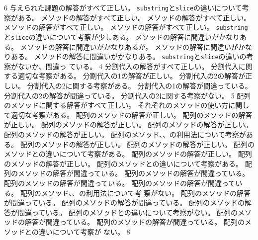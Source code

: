 {{}{6}{
  {与えられた課題の解答がすべて正しい。}
  {\texttt{substring}と\texttt{slice}の違いについて考察がある。}
	}
	{
	{メソッドの解答がすべて正しい。}
	{メソッドの解答がすべて正しい。}
	{メソッドの解答がすべて正しい。}
	{メソッドの解答がすべて正しい。}
  {\texttt{substring}と\texttt{slice}の違いについて考察が少しある。}
	}
	{
	{メソッドの解答に間違いがかなりある。}
	{メソッドの解答に間違いがかなりあるが。}
	{メソッドの解答に間違いがかなりある。}
	{メソッドの解答に間違いがかなりある。}
  {\texttt{substring}と\texttt{slice}の違いの考察がないか、間違っ
  ている。}
	}
  {}{4}{
	{分割代入の解答がすべて正しい。}
  {分割代入に関する適切な考察がある。}
  }
  {
	{分割代入の1の解答が正しい。}
	{分割代入の2の解答が正しい。}
	{分割代入の2に関する考察がある。}
  }
  {
	{分割代入の1の解答が間違っている。}
	{分割代入の2の解答が間違っている。}
	{分割代入の2に関する考察がない。}
  }
  {}{5}{
  {配列のメソッドに関する解答がすべて正しい。}
  {それぞれのメソッドの使い方に関して適切な考察がある。}
  }
  {
  {配列のメソッドの解答が正しい。}
  {配列のメソッドの解答が正しい。}
  {配列のメソッドの解答が正しい。}
  {配列のメソッドの解答が正しい。}
  {配列のメソッドの解答が正しい。}
  {配列のメソッド、、の利用法について考察がある。}
  {配列のメソッドの解答が正しい。}
  {配列のメソッドの解答が正しい。}
  {配列のメソッドとの違いについて考察がある。}
  {配列のメソッドの解答が正しい。}
  {配列のメソッドの解答が正しい。}
  {配列のメソッドとの違いについて考察がある。}
  }
  {
  {配列のメソッドの解答が間違っている。}
  {配列のメソッドの解答が間違っている。}
  {配列のメソッドの解答が間違っている。}
  {配列のメソッドの解答が間違っている。}
  {配列のメソッド、、の利用法について考
  察がない。}
  {配列のメソッドの解答が間違っている。}
  {配列のメソッドの解答が間違っている。}
  {配列のメソッドの解答が間違っている。}
  {配列のメソッドとの違いについて考察がない。}
  {配列のメソッドの解答が間違っている。}
  {配列のメソッドの解答が間違っている。}
  {配列のメソッドとの違いについて考察が
  ない。}
  }
	{}{8}
}
